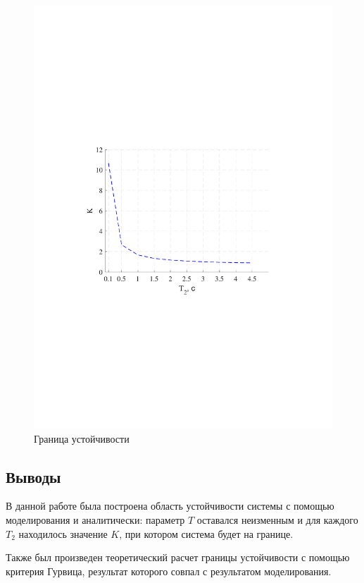 \documentclass[a4paper,12pt]{article}
\begin{document}
	 \begin{figure}[h]
	 	\renewcommand{\figurename}{Рисунок}
	 	\centering
	 	\includegraphics[width=6in]{RaschetMOD.pdf}
	 	\caption{Граница устойчивости}
	 	\label{s_4}
	 \end{figure}
 
 
 	\clearpage
 		\begin{center}
 	 \section{Выводы}
 		\end{center}
 	В данной работе была построена область устойчивости системы с помощью моделирования и аналитически: параметр $T$ оставался неизменным и для каждого $T_2$ находилось значение $K$, при котором система будет на границе.  
 	\par Также был произведен теоретический расчет границы устойчивости с помощью критерия Гурвица, результат которого совпал с результатом моделирования. 
	
	
	
	
\end{document}
